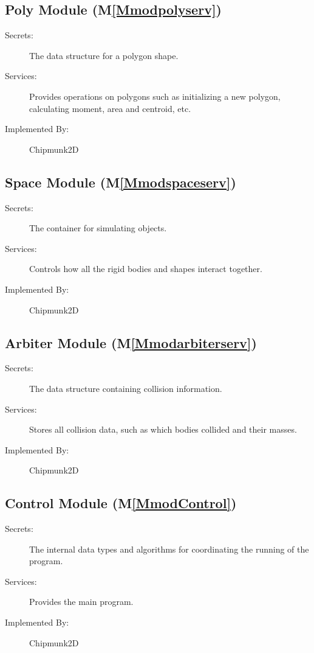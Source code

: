 \documentclass[12pt]{article}
\begin{document}
\subsection{Poly Module (M\ref{Mmodpolyserv})}
\label{Sec:PolyModu()}
\begin{description}
\item[Secrets:]The data structure for a polygon shape.
\item[Services:]Provides operations on polygons such as initializing a new polygon, calculating moment, area and centroid, etc.
\item[Implemented By:]Chipmunk2D
\end{description}
\subsection{Space Module (M\ref{Mmodspaceserv})}
\label{Sec:SpacModu()}
\begin{description}
\item[Secrets:]The container for simulating objects.
\item[Services:]Controls how all the rigid bodies and shapes interact together.
\item[Implemented By:]Chipmunk2D
\end{description}
\subsection{Arbiter Module (M\ref{Mmodarbiterserv})}
\label{Sec:ArbiModu()}
\begin{description}
\item[Secrets:]The data structure containing collision information.
\item[Services:]Stores all collision data, such as which bodies collided and their masses.
\item[Implemented By:]Chipmunk2D
\end{description}
\subsection{Control Module (M\ref{MmodControl})}
\label{Sec:ContModu()}
\begin{description}
\item[Secrets:]The internal data types and algorithms for coordinating the running of the program.
\item[Services:]Provides the main program.
\item[Implemented By:]Chipmunk2D
\end{description}
\end{document}
